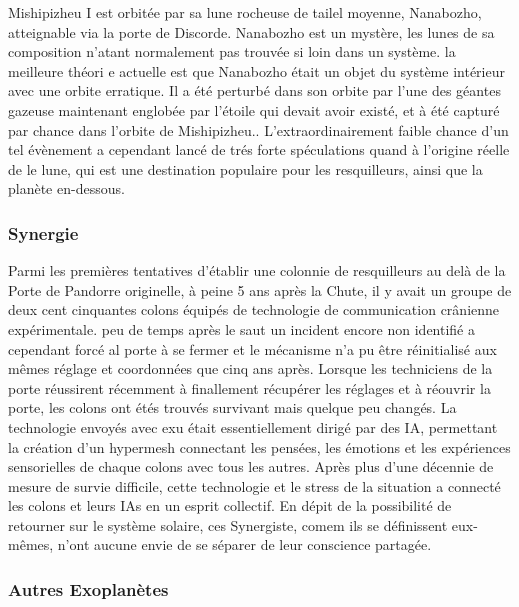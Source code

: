                                                                      Mishipizheu I est orbitée par sa lune rocheuse de tailel moyenne, Nanabozho, atteignable via la porte de Discorde. Nanabozho est un mystère, les lunes de sa composition n'atant normalement pas trouvée si loin dans un système. la meilleure théori e actuelle est que Nanabozho était un objet du système intérieur avec une orbite erratique. Il a été perturbé dans son orbite par l'une des géantes gazeuse maintenant englobée par l'étoile qui devait avoir existé, et à été capturé par chance dans l'orbite de Mishipizheu.. L'extraordinairement faible chance d'un tel évènement a cependant lancé de trés forte spéculations quand à l'origine réelle de le lune, qui est une destination populaire pour les resquilleurs, ainsi que la planète en-dessous. 

                                                                     \subsubsection{Synergie} \label{sec:synergy} 

                                                                     Parmi les premières tentatives d'établir une colonnie de resquilleurs au delà de la Porte de Pandorre originelle, à peine 5 ans après la Chute, il y avait un groupe de deux cent cinquantes colons équipés de technologie de communication crânienne expérimentale. peu de temps après le saut un incident encore non identifié a cependant forcé al porte à se fermer et le mécanisme n'a pu être réinitialisé aux mêmes réglage et coordonnées que cinq ans après. Lorsque les techniciens de la porte réussirent récemment à finallement récupérer les réglages et à réouvrir la porte, les colons ont étés trouvés survivant mais quelque peu changés. La technologie envoyés avec exu était essentiellement dirigé par des IA, permettant la création d'un hypermesh connectant les pensées, les émotions et les expériences sensorielles de chaque colons avec tous les autres. Après plus d'une décennie de mesure de survie difficile, cette technologie et le stress de la situation a connecté les colons et leurs IAs en un esprit collectif. En dépit de la possibilité de retourner sur le système solaire, ces Synergiste, comem ils se définissent eux-mêmes, n'ont aucune envie de se séparer de leur conscience partagée. 

                                                                     \subsubsection{Autres Exoplanètes} \label{sec:other-exoplanets} 

